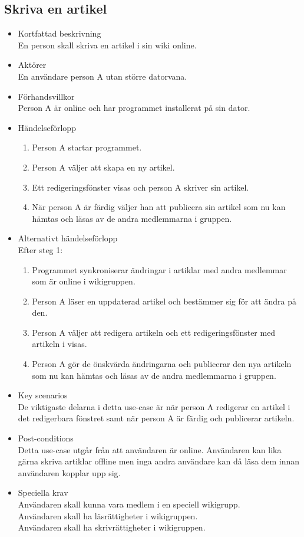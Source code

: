 \subsection{Skriva en artikel}
\begin{itemize}
	\item Kortfattad beskrivning
	\\En person skall skriva en artikel i sin wiki online.
	\item Aktörer
	\\En användare person A utan större datorvana.
	\item Förhandsvillkor
	\\Person A är online och har programmet installerat på sin dator.
	\item Händelseförlopp
	\begin{enumerate}
		\item Person A startar programmet.
		\item Person A väljer att skapa en ny artikel.
		\item Ett redigeringsfönster visas och person A skriver sin artikel.
		\item När person A är färdig väljer han att publicera sin artikel som nu kan hämtas och läsas av de andra medlemmarna i gruppen.
	\end{enumerate}
	\item Alternativt händelseförlopp
	\\Efter steg 1:
	\begin{enumerate}	
		\item Programmet synkroniserar ändringar i artiklar med andra medlemmar som är online i wikigruppen.
		\item Person A läser en uppdaterad artikel och bestämmer sig för att ändra på den.
		\item Person A väljer att redigera artikeln och ett redigeringsfönster med artikeln i visas.
		\item Person A gör de önskvärda ändringarna	och publicerar den nya artikeln	som nu kan hämtas och läsas av de andra medlemmarna i gruppen.
	\end{enumerate}
	\item Key scenarios
	\\De viktigaste delarna i detta use-case är när person A redigerar en artikel i det redigerbara fönstret samt när person A är färdig och publicerar artikeln.
	\item Post-conditions
	\\Detta use-case utgår från att användaren är online. Användaren kan lika gärna skriva artiklar offline men inga  andra användare kan då läsa dem innan användaren kopplar upp sig.
	\item Speciella krav
	\\Användaren skall kunna vara medlem i en speciell wikigrupp.
	\\Användaren skall ha läsrättigheter i wikigruppen.
	\\Användaren skall ha skrivrättigheter i wikigruppen.
\end{itemize}

